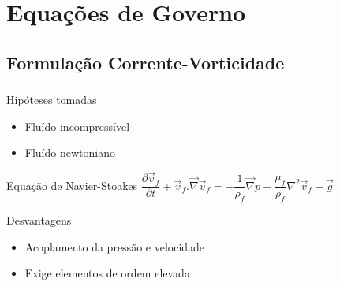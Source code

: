 \documentclass{beamer}
\begin{document}
\section{Equações de Governo}

\subsection{Formulação Corrente-Vorticidade}
\begin{frame}
  \frametitle{\subsecname}
  
  \begin{block}{Hipóteses tomadas}
    \begin{itemize}
     \item Fluído incompressível
     \item Fluído newtoniano
    \end{itemize}
  \end{block}
  
  \begin{block}{Equação de Navier-Stoakes}
    \centering
    $\dfrac{\partial \vec{v}_f}{\partial t} + \vec{v}_f.\vec{\nabla}\vec{v}_f =
    -\dfrac{1}{\rho_f} \vec{\nabla}p + \dfrac{\mu_f}{\rho_f} \nabla^2\vec{v}_f + \vec{g}$
  \end{block}
  
  \begin{block}{Desvantagens}
    \begin{itemize}
     \item Acoplamento da pressão e velocidade
     \item Exige elementos de ordem elevada
    \end{itemize}
  \end{block}
\end{frame}
\end{document}
